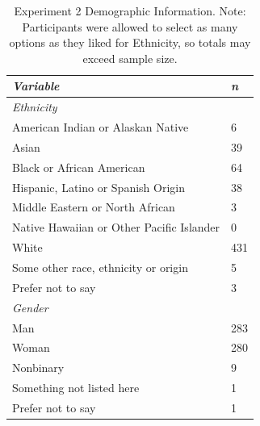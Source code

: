 \documentclass[12pt,]{article}
\begin{document}
\begin{table}[ht]
    \centering
    \begin{tabular}{l l}
        \toprule
        \emph{Variable} & \emph{n} \\
        \midrule
        \emph{Ethnicity} &  \\
        \hspace{1em} American Indian or Alaskan Native & 6 \\
        \hspace{1em} Asian & 39 \\
        \hspace{1em} Black or African American & 64 \\
        \hspace{1em} Hispanic, Latino or Spanish Origin & 38 \\
        \hspace{1em} Middle Eastern or North African & 3\\
        \hspace{1em} Native Hawaiian or Other Pacific Islander & 0 \\ 
        \hspace{1em} White & 431 \\ 
        \hspace{1em} Some other race, ethnicity or origin & 5 \\ 
        \hspace{1em} Prefer not to say & 3 \\ 
      \emph{Gender} & \\ 
         \hspace{1em} Man & 283 \\
         \hspace{1em} Woman & 280 \\
         \hspace{1em} Nonbinary & 9 \\
         \hspace{1em} Something not listed here & 1 \\
         \hspace{1em} Prefer not to say & 1 \\
        \bottomrule
    \end{tabular}
     \caption{Experiment 2 Demographic Information. Note: Participants were allowed to select as many options as they liked for Ethnicity, so totals may exceed sample size.}
     \label{demo2}
\end{table}


\end{document}
